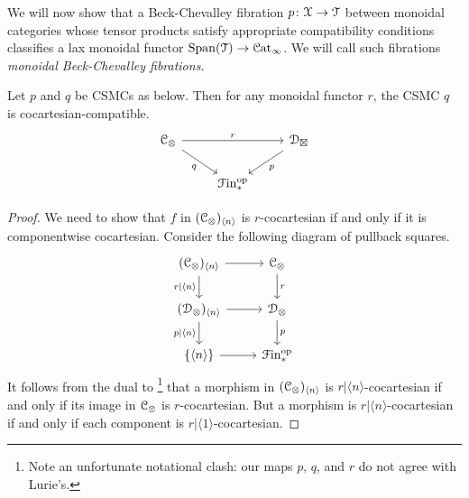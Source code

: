 \documentclass[main.tex]{subfiles}
\begin{document}
We will now show that a Beck-Chevalley fibration $p\colon \mathcal{X} \to \mathcal{T}$ between monoidal categories whose tensor products satisfy appropriate compatibility conditions classifies a lax monoidal functor $\mathrm{Span}(\mathcal{T}) \to \mathcal{C}\mathrm{at}_{\infty}$. We will call such fibrations \emph{monoidal Beck-Chevalley fibrations.}

\begin{lemma}
  \label{lemma:cocartesian_iff_componentwise_cocartesian}
  Let $p$ and $q$ be CSMCs as below. Then for any monoidal functor $r$, the CSMC $q$ is cocartesian-compatible.
  \begin{equation*}
    \begin{tikzcd}
      \category{C}_{\otimes}
      \arrow[rr, "r"]
      \arrow[dr, swap, "q"]
      && \category{D}_{\boxtimes}
      \arrow[dl, "p"]
      \\
      & \Finp\op
    \end{tikzcd}
  \end{equation*}
\end{lemma}
\begin{proof}
  We need to show that $f$ in $(\mathcal{C}_{\otimes})_{\langle n \rangle}$ is $r$-cocartesian if and only if it is componentwise cocartesian. Consider the following diagram of pullback squares.
  \begin{equation*}
    \begin{tikzcd}
      (\category{C}_{\otimes})_{\langle n \rangle}
      \arrow[r]
      \arrow[d, swap, "r|\langle n \rangle"]
      & \category{C}_{\otimes}
      \arrow[d, "r"]
      \\
      (\category{D}_{\otimes})_{\langle n \rangle}
      \arrow[r]
      \arrow[d, swap, "p|\langle n \rangle"]
      & \category{D}_{\otimes}
      \arrow[d, "p"]
      \\
      \{\langle n \rangle\}
      \arrow[r]
      & \Finp\op
    \end{tikzcd}
  \end{equation*}
  It follows from the dual to \cite[Cor.~4.3.1.15]{highertopostheory}\footnote{Note an unfortunate notational clash: our maps $p$, $q$, and $r$ do not agree with Lurie's.} that a morphism in $(\mathcal{C}_{\otimes})_{\langle n \rangle}$ is $r|\langle n \rangle$-cocartesian if and only if its image in $\mathcal{C}_{\otimes}$ is $r$-cocartesian. But a morphism is $r|\langle n \rangle$-cocartesian if and only if each component is $r|\langle 1 \rangle$-cocartesian.
\end{proof}
\end{document}
